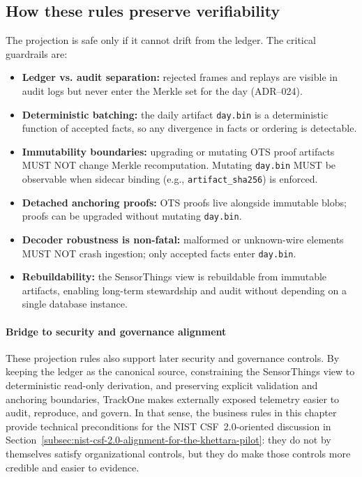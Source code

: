 \subsection{How these rules preserve verifiability}
\label{subsec:business_rules_verifiability}

The projection is safe only if it cannot drift from the ledger.
The critical guardrails are:
\begin{itemize}[nosep]
  \item \textbf{Ledger vs. audit separation:} rejected frames and replays are visible in audit logs but never enter the
  Merkle set for the day (\ac{ADR}--024).
  \item \textbf{Deterministic batching:} the daily artifact \texttt{day.bin} is a deterministic function of accepted facts,
    so any divergence in facts or ordering is detectable.
  \item \textbf{Immutability boundaries:} upgrading or mutating \ac{OTS} proof artifacts MUST NOT change Merkle recomputation.
  Mutating \texttt{day.bin} MUST be observable when sidecar binding (e.g., \texttt{artifact\_sha256}) is enforced.
  \item \textbf{Detached anchoring proofs:} \ac{OTS} proofs live alongside immutable blobs; proofs can be upgraded without
  mutating \texttt{day.bin}.
  \item \textbf{Decoder robustness is non-fatal:} malformed or unknown-wire elements MUST NOT crash ingestion;
    only accepted facts enter \texttt{day.bin}.
  \item \textbf{Rebuildability:} the SensorThings view is rebuildable from immutable artifacts, enabling long-term
    stewardship and audit without depending on a single database instance.
\end{itemize}

\paragraph{Bridge to security and governance alignment}
These projection rules also support later security and governance controls. By keeping the ledger as the canonical
source, constraining the SensorThings view to deterministic read-only derivation, and preserving explicit validation and
anchoring boundaries, TrackOne makes externally exposed telemetry easier to audit, reproduce, and govern. In that sense,
the business rules in this chapter provide technical preconditions for the \ac{NIST} C\ac{SF}~2.0-oriented discussion in
Section~\ref{subsec:nist-csf-2.0-alignment-for-the-khettara-pilot}: they do not by themselves satisfy organizational
controls, but they do make those controls more credible and easier to evidence.

